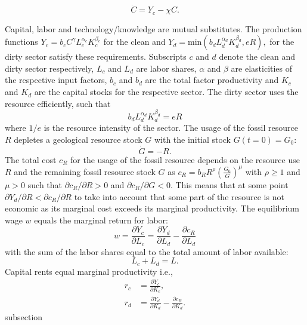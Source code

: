 \begin{equation}
	\dot{C} = Y_c - \chi C.
	\label{eq:approx_lbd}
\end{equation}

Capital, labor and technology/knowledge are mutual substitutes. The production functions $Y_c = b_c C^{\gamma} L_c^{\alpha_c}K_c^{\beta_c}$  for the clean and 	$Y_d = \mathrm{ min}\left( b_d L_d^{\alpha_d}K_d^{\beta_d}, e R \right),$ for the dirty sector satisfy these requirements. Subscripts $c$ and $d$ denote the clean and dirty sector respectively, $L_c$ and $L_d$ are labor shares, $\alpha$ and $\beta$ are elasticities of the respective input factors, $b_c$ and $b_d$ are the total factor productivity and $K_c$ and $K_d$ are the capital stocks for the respective sector.
The dirty sector uses the resource efficiently, such that
\begin{equation}
    b_d L_d^{\alpha_d}K_d^{\beta_d} = e R
    \label{eq:approx_edr}
\end{equation}
where $1/e$ is the resource intensity of the sector. The usage of the fossil resource $R$ depletes a geological resource stock $G$ with the initial stock $G(t=0) = G_0$:
\begin{equation}
    \dot{G} = -R. 
    \label{eq:approx_rdep}
\end{equation} 
The total cost $c_R$ for the usage of the fossil resource depends on the resource use $R$ and the remaining fossil resource stock $G$ as $c_R = b_R R^{\rho}\left( \frac{G_0}{G} \right)^{\mu}$ with $\rho \geq 1$ and $\mu > 0$ such that $\partial c_R / \partial R >0$ and $\partial c_R / \partial G < 0$.
This means that at some point $\partial Y_d / \partial R < \partial c_R / \partial R$ to take into account that some part of the resource is not economic as its marginal cost exceeds its marginal productivity.
The equilibrium wage $w$ equals the marginal return for labor:
\begin{equation}
	w = \frac{\partial Y_c}{\partial L_c} = \frac{\partial Y_d}{\partial L_d} - \frac{\partial c_R}{\partial L_d}
	\label{eq:approx_equilibrium_wage}
\end{equation}
with the sum of the labor shares equal to the total amount of labor available:
\begin{equation}
	L_c + L_d = L.
	\label{eq:approx_L}
\end{equation}
Capital rents equal marginal productivity i.e., 
\begin{align}
  r_c &= \frac{\partial Y_c}{\partial K_c}, \label{eq:approx_ccr} \\
  r_d &= \frac{\partial Y_d}{\partial K_d} - \frac{\partial c_R}{\partial K_d}. \label{eq:approx_dcr}
\end{align}
subsection
